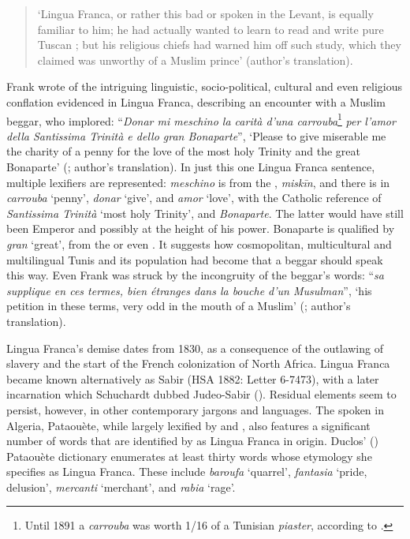 \documentclass[output=paper]{langsci/langscibook}
\begin{document}
	\begin{quote}
		‘Lingua Franca, or rather this bad  or  spoken in the Levant, is equally familiar to him; he had actually wanted to learn to read and write  pure Tuscan ; but his religious chiefs had warned him off such study, which they claimed was unworthy of a Muslim prince’ (author's translation).
	\end{quote}
	
	Frank wrote of the intriguing linguistic, socio-political, cultural and even religious conflation evidenced in Lingua Franca, describing an encounter with a Muslim beggar, who implored: “\textit{Donar mi meschino la carità d’una carrouba}\footnote{Until 1891 a \textit{carrouba} was worth 1/16 of a {Tunisian} \textit{piaster}, according to \citet{Rossetti1999}.} \textit{per l’amor della Santissima Trinità e dello gran Bonaparte}”, ‘Please to give miserable me the charity of a penny for the love of the most holy Trinity and the great Bonaparte’ (\citealt[101]{Frank1850}; author's translation). In just this one Lingua Franca sentence, multiple lexifiers are represented: \textit{meschino} is from the , \textit{miskīn}, and there is  in \textit{carrouba} ‘penny’, \textit{donar} ‘give’, and \textit{amor} ‘love’, with the  Catholic reference of \textit{Santissima Trinità} ‘most holy Trinity’, and  \textit{Bonaparte}. The latter would have still been Emperor and possibly at the height of his power. Bonaparte is qualified by \textit{gran} ‘great’, from the  or even . It suggests how cosmopolitan, multicultural and multilingual Tunis and its population had become that a beggar should speak this way. Even Frank was struck by the incongruity of the beggar’s words: ``\textit{sa supplique en ces termes, bien étranges dans la bouche d’un Musulman}'', ‘his petition in these terms, very odd in the mouth of a Muslim’ (\citealt[101]{Frank1850}; author's translation).
	
	Lingua Franca’s demise dates from 1830, as a consequence of the outlawing of slavery and the start of the French colonization of North Africa. Lingua Franca became known alternatively as Sabir (HSA 1882: Letter 6-7473), with a later incarnation which Schuchardt dubbed Judeo-Sabir (\citealt[87]{Schuchardt1909}). Residual elements seem to persist, however, in other contemporary jargons and languages. The  spoken in Algeria, Pataouète, while largely lexified by  and , also features a significant number of words that are identified by \citet{Lanly1962} as Lingua Franca in origin. Duclos’ (\citeyear{Duclos1992}) Pataouète dictionary enumerates at least thirty words whose etymology she specifies as Lingua Franca. These include \textit{baroufa} ‘quarrel', \textit{fantasia} ‘pride, delusion’, \textit{mercanti} ‘merchant’, and \textit{rabia} ‘rage’.
	
\end{document}
